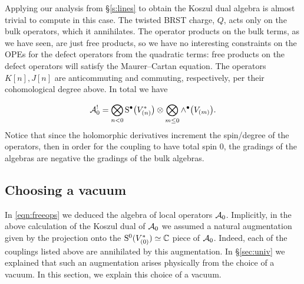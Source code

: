 \documentclass[11pt]{amsart}
\def\natalie#1{{\textcolor{green!65!black}{NMP: {#1}}}}
\begin{document}

Applying our analysis from \S \ref{s:lines} to obtain the Koszul dual algebra is almost trivial to compute in this case. 
The twisted BRST charge, $Q$, acts only on the bulk operators, which it annihilates. The operator products on the bulk terms, as we have seen, are just free products, so we have no interesting constraints on the OPEs for the defect operators from the quadratic terms: free products on the defect operators will satisfy the Maurer--Cartan equation. 
The operators $K[n], J[n]$ are anticommuting and commuting, respectively, per their cohomological degree above. In total we have

\begin{equation}\label{eq:freedual}
\mathcal{A}_0^{!} = \bigotimes_{n < 0} {\rm S}^\bullet \big(V^*_{(n)}\big) \otimes \bigotimes_{m \leq 0} \wedge^\bullet \big(V_{(m)}\big).
\end{equation} Notice that since the holomorphic derivatives increment the spin/degree of the operators, then in order for the coupling to have total spin 0, the gradings of the algebras are negative the gradings of the bulk algebras.


\subsection{Choosing a vacuum} 
In \eqref{eqn:freeops} we deduced the algebra of local operators $\mathcal A_0$. 
Implicitly, in the above calculation of the Koszul dual of $\mathcal A_0$ we assumed a natural augmentation given by the projection onto the ${\rm S}^0(V^*_{(0)})\simeq \mathbb C$ piece of $\mathcal A_0$. 
Indeed, each of the couplings listed above are annihilated by this augmentation. 
In \S \ref{sec:univ} we explained that such an augmentation arises physically from the choice of a vacuum. 
In this section, we explain this choice of a vacuum. 
\end{document}
